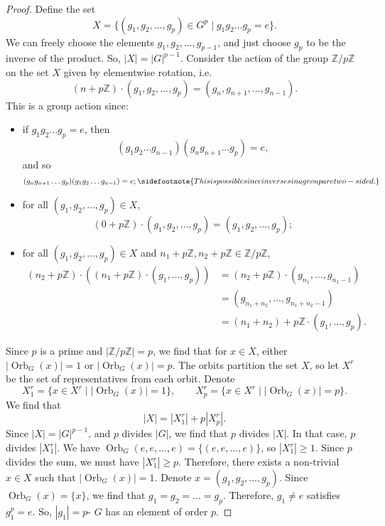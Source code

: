 \documentclass[a4paper, openany]{memoir}
\theoremstyle{definition}
\theoremstyle{plain}
\begin{document}
\begin{proof}
Define the set
\[X = \{(g_1, g_2, \dots, g_p) \in G^p \mid g_1 g_2 \dots g_p = e\}.\]
We can freely choose the elements $g_1, g_2, \dots, g_{p-1}$, and just choose $g_p$ to be the inverse of the product. So, $|X| = |G|^{p-1}$. Consider the action of the group $\mathbb{Z}/p \mathbb{Z}$ on the set $X$ given by elementwise rotation, i.e.
\[(n + p\mathbb{Z}) \cdot (g_1, g_2, \dots, g_p) = (g_n, g_{n+1}, \dots, g_{n-1}).\]
This is a group action since:
\begin{itemize}
    \item if $g_1g_2 \dots g_p = e$, then 
    \[(g_1g_2 \dots g_{n-1})(g_n g_{n+1} \dots g_p) = e,\]
    and so
    \[(g_n g_{n+1} \dots g_p)(g_1g_2 \dots g_{n-1}) = e;\sidefootnote{This is possible since inverses in a group are two-sided.}\]
    \item for all $(g_1, g_2, \dots, g_p) \in X$,
    \[(0 + p \mathbb{Z}) \cdot (g_1, g_2, \dots, g_p) = (g_1, g_2, \dots, g_p);\]
    \item for all $(g_1, g_2, \dots, g_p) \in X$ and $n_1 + p \mathbb{Z}, n_2 + p \mathbb{Z} \in \mathbb{Z}/p \mathbb{Z}$,
    \begin{align*}
        (n_2 + p\mathbb{Z}) \cdot ((n_1 + p \mathbb{Z}) \cdot (g_1, \dots, g_p)) &= (n_2 + p \mathbb{Z}) \cdot (g_{n_1}, \dots, g_{n_1-1}) \\
        &= (g_{n_1+n_2}, \dots, g_{n_1+n_2-1}) \\
        &= (n_1+n_2) + p \mathbb{Z} \cdot (g_1, \dots, g_p).
    \end{align*}
\end{itemize}
Since $p$ is a prime and $|\mathbb{Z}/p \mathbb{Z}| = p$, we find that for $x \in X$, either $|\operatorname{Orb}_G(x)| = 1$ or $|\operatorname{Orb}_G(x)| = p$. The orbits partition the set $X$, so let $X^r$ be the set of representatives from each orbit. Denote
\[X_1^r = \{x \in X^r \mid |\operatorname{Orb}_G(x)| = 1\}, \qquad X_p^r = \{x \in X^r \mid |\operatorname{Orb}_G(x)| = p\}.\]
We find that
\[|X| = |X_1^r| + p|X_p^r|.\]
Since $|X| = |G|^{p-1}$, and $p$ divides $|G|$, we find that $p$ divides $|X|$. In that case, $p$ divides $|X_1^r|$. We have $\operatorname{Orb}_G(e, e, \dots, e) = \{(e, e, \dots, e)\}$, so $|X_1^r| \geqslant 1$. Since $p$ divides the sum, we must have $|X_1^r| \geqslant p$. Therefore, there exists a non-trivial $x \in X$ such that $|\operatorname{Orb}_G(x)| = 1$. Denote $x = (g_1, g_2, \dots, g_p)$. Since $\operatorname{Orb}_G(x) = \{x\}$, we find that $g_1 = g_2 = \dots = g_p$. Therefore, $g_1 \neq e$ satisfies $g_1^p = e$. So, $|g_1| = p$- $G$ has an element of order $p$.
\end{proof}
\end{document}
